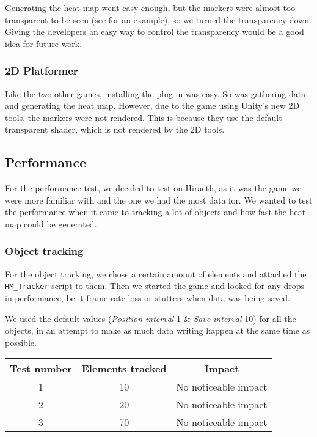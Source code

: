 Generating the heat map went easy enough, but the markers were almost too transparent to be seen (see  for an example), so we turned the transparency down. Giving the developers an easy way to control the transparency would be a good idea for future work.


\subsubsection{2D Platformer}
\label{Testing_Games_2D}

Like the two other games, installing the plug-in was easy. So was gathering data and generating the heat map. However, due to the game using Unity's new 2D tools, the markers were not rendered. This is because they use the default transparent shader, which is not rendered by the 2D tools.

\subsection{Performance}
\label{Testing_Performance}

For the performance test, we decided to test on Hiraeth, as it was the game we were more familiar with and the one we had the most data for. We wanted to test the performance when it came to tracking a lot of objects and how fast the heat map could be generated.

\subsubsection{Object tracking}
\label{Testing_Performance_Tracking}

For the object tracking, we chose a certain amount of elements and attached the \texttt{HM\_Tracker} script to them. Then we started the game and looked for any drops in performance, be it frame rate loss or stutters when data was being saved.

We used the default values (\textit{Position interval} 1 \& \textit{Save interval} 10) for all the objects, in an attempt to make as much data writing happen at the same time as possible.

\begin{center}
	\begin{tabular}{| c | c | c |}
		\hline
		Test number & Elements tracked & Impact \\ \hline
		1 & 10 & No noticeable impact \\ \hline
		2 & 20 & No noticeable impact \\ \hline
		3 & 70 & No noticeable impact \\
		\hline
	\end{tabular}
\end{center}

